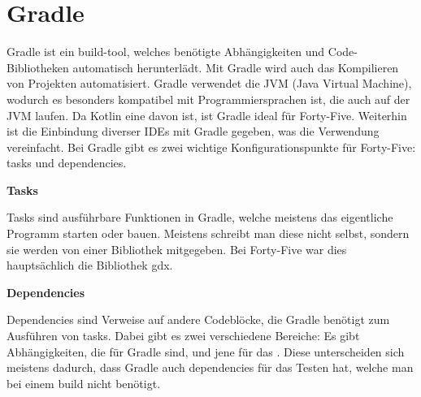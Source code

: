 
\renewcommand{\kapitelautor}{Autor: Felix Zwickelstorfer}
\section{Gradle}\label{sec:gradle}

\renewcommand{\kapitelautor}{Autor: Felix Zwickelstorfer}

Gradle ist ein build-tool, welches benötigte Abhängigkeiten und Code-Bibliotheken automatisch herunterlädt.
Mit Gradle wird auch das Kompilieren von Projekten automatisiert.
Gradle verwendet die JVM (Java Virtual Machine), wodurch es besonders kompatibel mit Programmiersprachen ist, die auch auf der JVM laufen.
Da Kotlin eine davon ist, ist Gradle ideal für Forty-Five.
Weiterhin ist die Einbindung diverser IDEs mit Gradle gegeben, was die Verwendung vereinfacht.
Bei Gradle gibt es zwei wichtige Konfigurationspunkte für Forty-Five: tasks und dependencies.

\textbf{Tasks}

Tasks sind ausführbare Funktionen in Gradle, welche meistens das eigentliche Programm starten oder bauen.
Meistens schreibt man diese nicht selbst, sondern sie werden von einer Bibliothek mitgegeben.
Bei Forty-Five war dies hauptsächlich die Bibliothek gdx.

\textbf{Dependencies}

Dependencies sind Verweise auf andere Codeblöcke, die Gradle benötigt zum Ausführen von tasks.
Dabei gibt es zwei verschiedene Bereiche: Es gibt Abhängigkeiten, die für Gradle sind, und jene für das .
Diese unterscheiden sich meistens dadurch, dass Gradle auch dependencies für das Testen hat, welche man bei einem build nicht benötigt.
